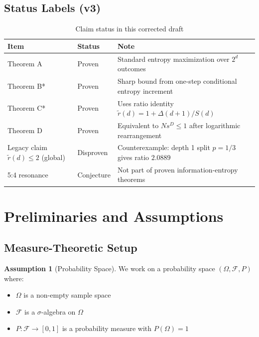 \documentclass[11pt,a4paper]{article}
\theoremstyle{definition}
\newtheorem{assumption}[theorem]{Assumption}
\theoremstyle{remark}
\newcommand{\rtilde}{\tilde{r}}
\newcommand{\Field}{\mathcal{F}}
\begin{document}
\subsection{Status Labels (v3)}
\begin{table}[H]
\centering
\caption{Claim status in this corrected draft}
\label{tab:status_labels}
\begin{tabular}{@{}lll@{}}
\toprule
\textbf{Item} & \textbf{Status} & \textbf{Note} \\
\midrule
Theorem A & Proven & Standard entropy maximization over $2^d$ outcomes \\
Theorem B* & Proven & Sharp bound from one-step conditional entropy increment \\
Theorem C* & Proven & Uses ratio identity $\rtilde(d)=1+\Delta(d+1)/S(d)$ \\
Theorem D & Proven & Equivalent to $Ns^D\le1$ after logarithmic rearrangement \\
Legacy claim $\rtilde(d)\le2$ (global) & Disproven & Counterexample: depth 1 split $p=1/3$ gives ratio $2.0889$ \\
5:4 resonance & Conjecture & Not part of proven information-entropy theorems \\
\bottomrule
\end{tabular}
\end{table}

\section{Preliminaries and Assumptions}
\label{sec:preliminaries}

\subsection{Measure-Theoretic Setup}

\begin{assumption}[Probability Space]
\label{ass:prob_space}
We work on a probability space $(\Omega, \Field, P)$ where:
\begin{itemize}[nosep]
    \item $\Omega$ is a non-empty sample space
    \item $\Field$ is a $\sigma$-algebra on $\Omega$
    \item $P: \Field \to [0,1]$ is a probability measure with $P(\Omega) = 1$
\end{itemize}
\end{assumption}
\end{document}
